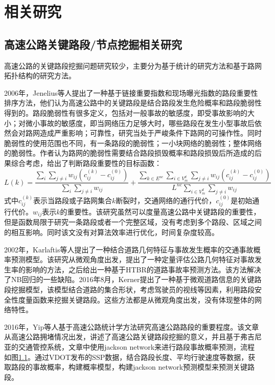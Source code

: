 
\chapter{相关研究}

\section{高速公路关键路段/节点挖掘相关研究}
	高速公路的关键路段挖掘问题研究较少，主要分为基于统计的研究方法和基于路网拓扑结构的研究方法。

	2006年，Jenelius等人提出了一种基于链接重要指数和现场曝光指数的路段重要性排序方法\parencite{Jenelius2006Importance}，他们认为高速公路中的关键路段是结合路段发生危险概率和路段脆弱性得到的。路段脆弱性有很多定义，包括对一般事故的敏感度，即受事故影响的大小；对微小事故的敏感度，即当网络压力足够大时，哪些路段在发生小型事故后依然会对路网造成严重影响；可靠性，研究当处于严峻条件下路网的可操作性。同时脆弱性的使用范围也不同，有一条路段的脆弱性；一小块网络的脆弱性；整体网络的脆弱性。作者认为路网的脆弱性需要结合路段损毁概率和路段损毁后所造成的后果综合考虑，给出了判断路段重要性的目标函数：
	$$L(k)=\frac{{\sum\limits_i {\sum\limits_{j \ne i} {{w_{ij}}(c_{ij}^{(k)} - c_{ij}^{(0)})} } }}{{\sum\limits_i {\sum\limits_{j \ne i} {{w_{ij}}} } }} + \frac{{\sum\limits_{k \in {E^{nc}}} {\sum\limits_{i \in V_m^d} {\sum\limits_{j \ne i} {{w_{ij}}(c_{ij}^{(k)} - c_{ij}^{(0)})} } } }}{{{L^{nc}}\sum\limits_{i \in V_m^d} {\sum\limits_{j \ne i} {{w_{ij}}} } }}$$
	式中$c_{ij}^{(k)}$表示当路段或子路网集合$k$断裂时，交通网络的通行代价，$c_{ij}^{(0)}$是初始通行代价。$w_{ij}$表示$k$的重要性。该研究虽然可以度量高速公路中关键路段的重要性，但是函数局限于研究一条路段或者一个完整区域，没有考虑到多个路段、区域之间的相互影响。同时该文没有对算法效率进行优化，时间复杂度较高。

	2002年，Karlaftis等人提出了一种结合道路几何特征与事故发生概率的交通事故概率预测模型\parencite{Karlaftis2002Effects}。该研究从微观角度出发，提出了一种定量评估公路几何特征对事故发生率的影响的方法，之后给出一种基于HTBR的道路事故率预测方法。该方法解决了NB回归的一些缺陷。2016年8月，Kerner提出了一种基于微观道路信息的关键路段挖掘模型\parencite{Kerner2015The}，该模型结合道路的集合形状，考虑驾驶员的视线等因素，利用路段安全性度量函数来挖掘关键路段。这些方法都是从微观角度出发，没有体现整体的网络特性。

	2016年，Yip等人基于高速公路统计学方法\parencite{YipTongji}研究高速公路路段的重要程度。该文章从高速公路拥堵情况出发，讲述了高速公路关键路段挖掘的意义，并且基于弗吉尼亚的交通管控系统，文章中使用jackson network来进行路段事故概率预测，流程如图\ref{}。通过VDOT发布的SSP数据，结合路段长度、平均行驶速度等数据，获取路段的事故概率，构建概率模型，构建jackson network预测模型来预测关键路段。

